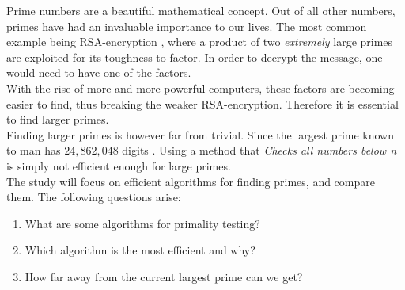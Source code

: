 \documentclass[main.tex]{subfiles}
\begin{document}
Prime numbers are a beautiful mathematical concept. Out of all other numbers,
primes have had an invaluable importance to our lives. The most common example
being RSA-encryption \cite{rsa}, where a product of two \emph{extremely} large primes are
exploited for its toughness to factor. In order to decrypt the message, one
would need to have one of the factors. \\

With the rise of more and more powerful computers, these factors are becoming
easier to find, thus breaking the weaker RSA-encryption. Therefore it
is essential to find larger primes. \\

Finding larger primes is however far from trivial. Since the largest prime known
to man has $24,862,048$ digits \cite{prime:largest_digits}. Using a method
that \emph{Checks all numbers below n} is simply not efficient enough for large
primes. \\

The study will focus on efficient algorithms for finding primes, and compare
them. The following questions arise:

\begin{enumerate}
\item What are some algorithms for primality testing?
\item Which algorithm is the most efficient and why?
\item How far away from the current largest prime can we get?
\end{enumerate}
\end{document}
